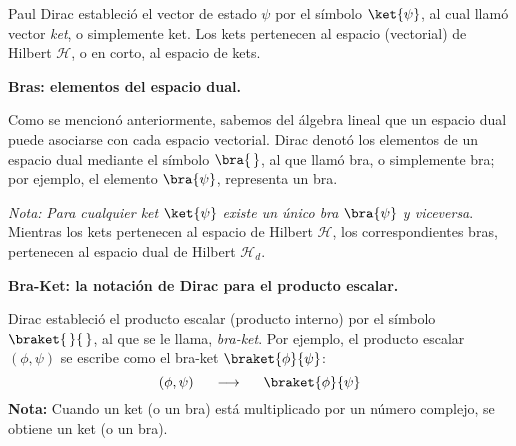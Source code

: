 Paul Dirac estableció el vector de estado $\psi$ por el símbolo $\ket{\psi}$, al cual llamó vector \emph{ket}, o simplemente ket. Los kets pertenecen al espacio (vectorial) de Hilbert $\mathcal{H}$, o en corto, al espacio de kets.
\par
\textbf{Bras: elementos del espacio dual.}

Como se mencionó anteriormente, sabemos del álgebra lineal que un espacio dual puede asociarse con cada espacio vectorial. Dirac denotó los elementos de un espacio dual mediante el símbolo $\bra{ \, }$, al que llamó bra, o simplemente bra; por ejemplo, el elemento $\bra{\psi}$, representa un bra.
\par
\textit{Nota: } \emph{Para cualquier ket $\ket{\psi}$ existe un único bra $\bra{\psi}$ y viceversa}. Mientras los kets pertenecen al espacio de Hilbert $\mathcal{H}$, los correspondientes bras, pertenecen al espacio dual de Hilbert $\mathcal{H}_{d}$.
\par
\textbf{Bra-Ket: la notación de Dirac para el producto escalar.}

Dirac estableció el producto escalar (producto interno) por el símbolo $\braket{\,}{\,}$, al que se le llama, \emph{bra-ket}. Por ejemplo, el producto escalar $(\phi, \psi)$ se escribe como el bra-ket $\braket{\phi}{\psi}$:
\begin{equation}
(\phi, \psi) \hspace{0.5cm} \longrightarrow \hspace{0.5cm} \braket{\phi}{\psi}
\label{eq:ecuacion_02_24}
\end{equation}
\textbf{Nota: } Cuando un ket (o un bra) está multiplicado por un número complejo, se obtiene un ket (o un bra).

